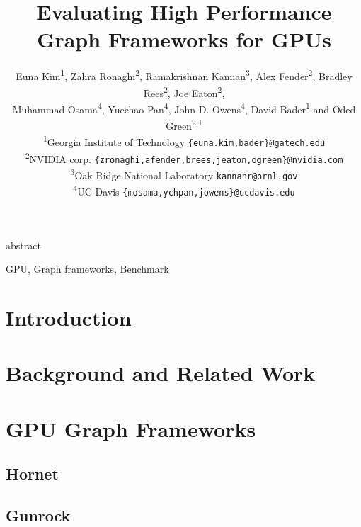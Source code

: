 \documentclass[conference]{IEEEtran}
\newcommand*{\affaddr}[1]{#1} %
\newcommand*{\affmark}[1][*]{\textsuperscript{#1}}
\newcommand*{\email}[1]{\texttt{#1}}
\begin{document}
\title{Evaluating High Performance Graph Frameworks for GPUs}

\author{%
Euna Kim\affmark[1], Zahra Ronaghi\affmark[2], Ramakrishnan Kannan\affmark[3], Alex Fender\affmark[2], Bradley Rees\affmark[2], Joe Eaton\affmark[2],\\ Muhammad Osama\affmark[4], Yuechao Pan\affmark[4], John D. Owens\affmark[4], David Bader\affmark[1] and Oded Green\affmark[2,1]\\
\affaddr{\affmark[1]Georgia Institute of Technology} \email{\{euna.kim,bader\}@gatech.edu}\\
\affaddr{\affmark[2]NVIDIA corp.} \email{\{zronaghi,afender,brees,jeaton,ogreen\}@nvidia.com}\\
\affaddr{\affmark[3]Oak Ridge National Laboratory} \email{kannanr@ornl.gov}\\
\affaddr{\affmark[4]UC Davis} \email{\{mosama,ychpan,jowens\}@ucdavis.edu}
}



\maketitle

 {abstract}
\begin{IEEEkeywords}
GPU, Graph frameworks, Benchmark
\end{IEEEkeywords}

\section{Introduction}
\label{sec:intro}


\section{Background and Related Work}
\label{sec:background-related}


\section{GPU Graph Frameworks} %
\label{sec:gpu-framework}

\subsection{Hornet}

\subsection{Gunrock}

\end{document}
